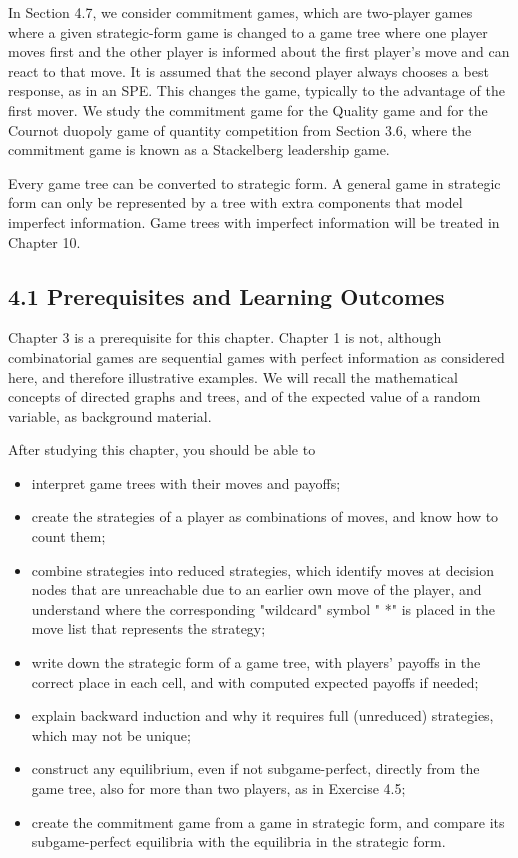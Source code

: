 \documentclass[12pt]{article}
\begin{document}
In Section 4.7, we consider commitment games, which are two-player games where a given strategic-form game is changed to a game tree where one player moves first and the other player is informed about the first player's move and can react to that move. It is assumed that the second player always chooses a best response, as in an SPE. This changes the game, typically to the advantage of the first mover. We study the commitment game for the Quality game and for the Cournot duopoly game of quantity competition from Section 3.6, where the commitment game is known as a Stackelberg leadership game.

Every game tree can be converted to strategic form. A general game in strategic form can only be represented by a tree with extra components that model imperfect information. Game trees with imperfect information will be treated in Chapter 10.

\subsection*{4.1 Prerequisites and Learning Outcomes}
Chapter 3 is a prerequisite for this chapter. Chapter 1 is not, although combinatorial games are sequential games with perfect information as considered here, and therefore illustrative examples. We will recall the mathematical concepts of directed graphs and trees, and of the expected value of a random variable, as background material.

After studying this chapter, you should be able to

\begin{itemize}
  \item interpret game trees with their moves and payoffs;
  \item create the strategies of a player as combinations of moves, and know how to count them;
  \item combine strategies into reduced strategies, which identify moves at decision nodes that are unreachable due to an earlier own move of the player, and understand where the corresponding "wildcard" symbol " *" is placed in the move list that represents the strategy;
  \item write down the strategic form of a game tree, with players' payoffs in the correct place in each cell, and with computed expected payoffs if needed;
  \item explain backward induction and why it requires full (unreduced) strategies, which may not be unique;
  \item construct any equilibrium, even if not subgame-perfect, directly from the game tree, also for more than two players, as in Exercise 4.5;
  \item create the commitment game from a game in strategic form, and compare its subgame-perfect equilibria with the equilibria in the strategic form.
\end{itemize}
\end{document}
